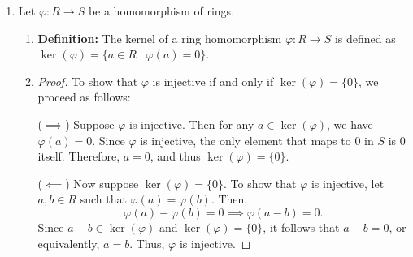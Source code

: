 \documentclass{article}
\begin{document}
\begin{enumerate}
\begin{enumerate}
\begin{proof}
\begin{enumerate}
                \item Let $f, g \in R[X]$ with $\deg(f) = m$ and $\deg(g) = n$. Without loss of generality, assume $m \geq n$. Then we can write
                \begin{align*}
                    f &= a_m X^m + a_{m-1} X^{m-1} + \cdots + a_0, \\
                    g &= b_n X^n + b_{n-1} X^{n-1} + \cdots + b_0, \\
                \end{align*}
                The sum $f + g$ is given by
                \begin{align*}
                    f + g &= (a_m X^m + \cdots) + (b_n X^n + \cdots) \\
                          &= a_m X^m + \cdots + b_n X^n + \cdots.
                \end{align*}
                If $a_m + b_n \neq 0$, then $\deg(f + g) = m$. If $a_m + b_n = 0$, then the highest degree term cancels out, and we need to consider the next highest degree terms. In any case, we have $\deg(f + g) \leq \max(\deg(f), \deg(g))$, as desired.
            \end{enumerate}
        \end{proof}
    \end{enumerate}


    \item Let $\varphi : R \to S$ be a homomorphism of rings.
    \begin{enumerate}
        \item %
        \textbf{Definition: }The kernel of a ring homomorphism $\varphi : R \to S$ is defined as $\ker(\varphi) = \{a \in R \mid \varphi(a) = 0\}$.
        \item %
        \begin{proof}
            To show that $\varphi$ is injective if and only if $\ker(\varphi) = \{0\}$, we proceed as follows:

            ($\implies$) Suppose $\varphi$ is injective. Then for any $a \in \ker(\varphi)$, we have $\varphi(a) = 0$. Since $\varphi$ is injective, the only element that maps to $0$ in $S$ is $0$ itself. Therefore, $a = 0$, and thus $\ker(\varphi) = \{0\}$.

            ($\impliedby$) Now suppose $\ker(\varphi) = \{0\}$. To show that $\varphi$ is injective, let $a, b \in R$ such that $\varphi(a) = \varphi(b)$. Then,
            \[
                \varphi(a) - \varphi(b) = 0 \implies \varphi(a - b) = 0.
            \]
            Since $a - b \in \ker(\varphi)$ and $\ker(\varphi) = \{0\}$, it follows that $a - b = 0$, or equivalently, $a = b$. Thus, $\varphi$ is injective.


\end{proof}
\end{enumerate}
\end{enumerate}
\end{document}
